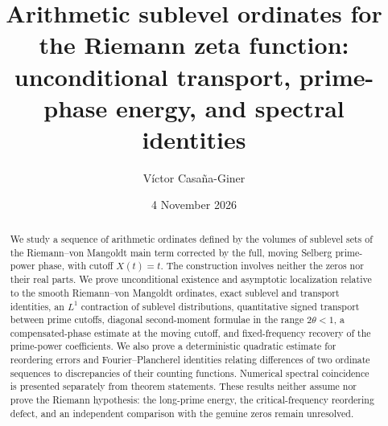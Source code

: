 \documentclass[11pt,leqno]{amsart}
\title[Prime-weighted sublevel ordinates]{Arithmetic sublevel ordinates for the Riemann zeta function:\\ unconditional transport, prime-phase energy, and spectral identities}
\author{V\'ictor Casa\~na-Giner}
\date{4 November 2026}
\numberwithin{equation}{section}
\theoremstyle{definition}
\theoremstyle{remark}
\newcommand{\1}{\mathbf 1}
\begin{document}
\begin{abstract}
We study a sequence of arithmetic ordinates defined by the volumes of sublevel sets of the Riemann--von Mangoldt main term corrected by the full, moving Selberg prime-power phase, with cutoff $X(t)=t$. The construction involves neither the zeros nor their real parts. We prove unconditional existence and asymptotic localization relative to the smooth Riemann--von Mangoldt ordinates, exact sublevel and transport identities, an $L^1$ contraction of sublevel distributions, quantitative signed transport between prime cutoffs, diagonal second-moment formulae in the range $2\theta<1$, a compensated-phase estimate at the moving cutoff, and fixed-frequency recovery of the prime-power coefficients. We also prove a deterministic quadratic estimate for reordering errors and Fourier--Plancherel identities relating differences of two ordinate sequences to discrepancies of their counting functions. Numerical spectral coincidence is presented separately from theorem statements. These results neither assume nor prove the Riemann hypothesis: the long-prime energy, the critical-frequency reordering defect, and an independent comparison with the genuine zeros remain unresolved.
\end{abstract}
\maketitle
\tableofcontents
\end{document}
